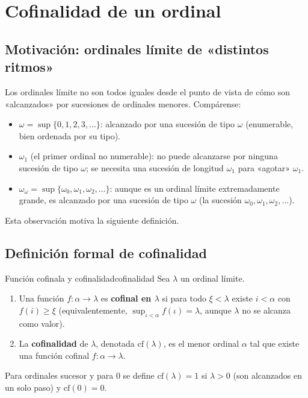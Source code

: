 \section{Cofinalidad de un ordinal}

\subsection{Motivación: ordinales límite de «distintos ritmos»}

Los ordinales límite no son todos iguales desde el punto de vista de cómo son «alcanzados» por sucesiones de ordinales menores. Compárense:

\begin{itemize}[leftmargin=2em]
  \item $\omega = \sup\{0, 1, 2, 3, \ldots\}$: alcanzado por una sucesión de tipo $\omega$ (enumerable, bien ordenada por su tipo).
  \item $\omega_1$ (el primer ordinal no numerable): no puede alcanzarse por ninguna sucesión de tipo $\omega$; se necesita una sucesión de longitud $\omega_1$ para «agotar» $\omega_1$.
  \item $\omega_\omega = \sup\{\omega_0, \omega_1, \omega_2, \ldots\}$: aunque es un ordinal límite extremadamente grande, es alcanzado por una sucesión de tipo $\omega$ (la sucesión $\omega_0, \omega_1, \omega_2, \ldots$).
\end{itemize}

Esta observación motiva la siguiente definición.

\subsection{Definición formal de cofinalidad}

\begin{definicion}{Función cofinala y cofinalidad}{cofinalidad}
Sea $\lambda$ un ordinal límite.
\begin{enumerate}[leftmargin=2em, label=(\roman*)]
  \item Una función $f: \alpha \to \lambda$ es \textbf{cofinal en $\lambda$} si para todo $\xi < \lambda$ existe $i < \alpha$ con $f(i) \geq \xi$ (equivalentemente, $\sup_{\iota < \alpha} f(\iota) = \lambda$, aunque $\lambda$ no se alcanza como valor).
  \item La \textbf{cofinalidad} de $\lambda$, denotada $\mathrm{cf}(\lambda)$, es el menor ordinal $\alpha$ tal que existe una función cofinal $f: \alpha \to \lambda$.
\end{enumerate}
Para ordinales sucesor y para $0$ se define $\mathrm{cf}(\lambda) = 1$ si $\lambda > 0$ (son alcanzados en un solo paso) y $\mathrm{cf}(0) = 0$.
\end{definicion}

